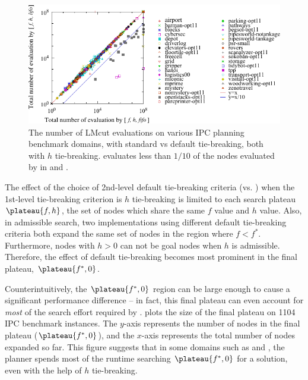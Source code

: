 \begin{figure}[htbp]
 \centering {}
 \includegraphics[width=\linewidth]{tables/aaai16-30min-5min-cut/aaai16prelim3/evaluated-lmcut_ff-lmcut_lf.pdf}
 \caption{The number of LMcut evaluations on various IPC planning benchmark domains,
 with standard \fifo vs \lifo default tie-breaking, both with $h$
 tie-breaking. \lifo evaluates  less than $1/10$ of the nodes evaluated
 by \fifo in  and . 
 }
 \label{fig:f-h-eval}
\end{figure}

The effect of the choice of 2nd-level default tie-breaking criteria (\lifo vs.
\fifo)  when the 1st-level tie-breaking criterion is  $h$ tie-breaking is
limited to each search plateau $\plateau{f,h}$, the set of nodes which
share the same $f$ value and $h$ value.
% 
Also, in admissible search, two \astar implementations using 
different default tie-breaking criteria both expand the same set of
nodes in the region where $f<f^*$.
% 
Furthermore, nodes with $h>0$ can not be goal nodes when $h$ is admissible.
% 
Therefore, the effect of default tie-breaking becomes most prominent in the final plateau, $\plateau{f^*,0}$.

Counterintuitively, the $\plateau{f^*, 0}$ region can be large enough to
cause a significant performance difference -- in fact, this final plateau can even account for \emph{most} of the
search effort required by \astar.
 plots the size of the final plateau on 1104 IPC
benchmark instances.  The $y$-axis represents the number of nodes in
the final plateau ($\plateau{f^*, 0}$), and the $x$-axis represents the total
number of nodes expanded so far. This figure suggests that in some
domains such as  and , the planner
spends most of the runtime searching $\plateau{f^*, 0}$ for a solution,
even with the help of $h$ tie-breaking.

